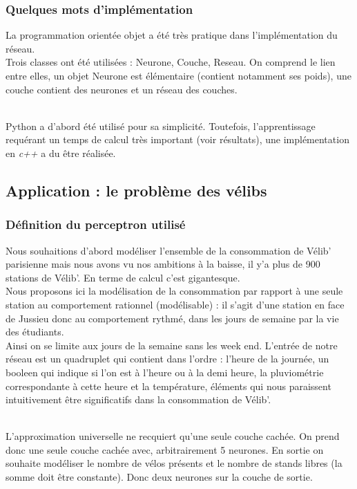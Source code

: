 \documentclass[a4paper, 11pt]{article}
\begin{document}
	\subsubsection{Quelques mots d'implémentation}

	La programmation orientée objet a été très pratique dans l'implémentation du réseau.
	\\Trois classes ont été utilisées : Neurone, Couche, Reseau. On comprend le lien entre elles, un objet Neurone est élémentaire (contient notamment ses poids), une couche contient des neurones et un réseau des couches.

	\\Python a d'abord été utilisé pour sa simplicité. Toutefois, l'apprentissage requérant un temps de calcul très important (voir résultats), une implémentation en \emph{c++} a du être réalisée.
\subsection{Application : le problème des vélibs}
\subsubsection{Définition du perceptron utilisé}

Nous souhaitions d'abord modéliser l'ensemble de la consommation de Vélib' parisienne mais nous avons vu nos ambitions à la baisse, il y'a plus de 900 stations de Vélib'.
En terme de calcul c'est gigantesque.
\\Nous proposons ici la modélisation de la consommation par rapport à une seule station au comportement rationnel (modélisable) : il s'agit d'une station en face de Jussieu donc au comportement rythmé, dans les jours de semaine par la vie des étudiants.
\\Ainsi on se limite aux jours de la semaine sans les week end. L'entrée de notre réseau est un quadruplet qui contient dans l'ordre : l'heure de la journée, un booleen qui indique si l'on est à l'heure ou à la demi heure, la pluviométrie correspondante à cette heure et la température, éléments qui nous paraissent intuitivement être significatifs dans la consommation de Vélib'.

\\L'approximation universelle ne recquiert qu'une seule couche cachée. On prend donc une seule couche cachée avec, arbitrairement 5 neurones. En sortie on souhaite modéliser le nombre de vélos présents et le nombre de stands libres (la somme doit être constante). Donc deux neurones sur la couche de sortie.
\end{document}
